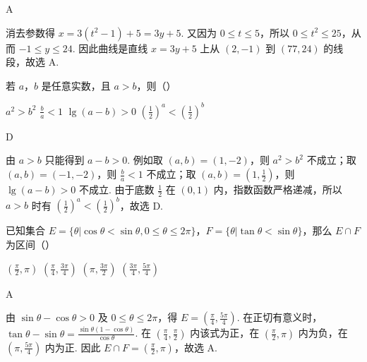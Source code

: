 \begin{answer}
A
\end{answer}

\begin{solution}
消去参数得 \(x=3(t^2-1)+5=3y+5\). 又因为
\(0\leqslant t\leqslant5\)，所以 \(0\leqslant t^2\leqslant25\)，从而
\(-1\leqslant y\leqslant24\). 因此曲线是直线
\(x=3y+5\) 上从 \((2,-1)\) 到 \((77,24)\) 的线段，故选 A.
\end{solution}

\begin{problem}
若 \(a\)，\(b\) 是任意实数，且 \(a > b\)，则（\quad）

\choices
    {\(a^2 > b^2\)}
    {\(\frac{b}{a} < 1\)}
    {\(\lg (a - b) > 0\)}
    {\(\left(\frac{1}{2}\right)^a < \left(\frac{1}{2}\right)^b\)}
\end{problem}

\begin{answer}
D
\end{answer}

\begin{solution}
由 \(a>b\) 只能得到 \(a-b>0\). 例如取 \((a,b)=(1,-2)\)，则
\(a^2>b^2\) 不成立；取 \((a,b)=(-1,-2)\)，则
\(\frac{b}{a}<1\) 不成立；取 \((a,b)=(1,\frac{1}{2})\)，则
\(\lg(a-b)>0\) 不成立. 由于底数
\(\frac{1}{2}\) 在 \((0,1)\) 内，指数函数严格递减，所以
\(a>b\) 时有
\(\left(\frac{1}{2}\right)^a<\left(\frac{1}{2}\right)^b\)，故选 D.
\end{solution}

\begin{problem}
已知集合 \(E = \{\theta | \cos \theta < \sin \theta, 0 \leqslant \theta \leqslant 2\pi\}\)，\(F = \{\theta | \tan \theta < \sin \theta\}\)，那么 \(E \cap F\) 为区间（\quad）

\choices
    {\(\left(\frac{\pi}{2},\pi\right)\)}
    {\(\left(\frac{\pi}{4},\frac{3\pi}{4}\right)\)}
    {\(\left(\pi,\frac{3\pi}{2}\right)\)}
    {\(\left(\frac{3\pi}{4},\frac{5\pi}{4}\right)\)}
\end{problem}

\begin{answer}
A
\end{answer}

\begin{solution}
由 \(\sin\theta-\cos\theta>0\) 及 \(0\leqslant\theta\leqslant2\pi\)，得
\(E=\left(\frac{\pi}{4},\frac{5\pi}{4}\right)\). 在正切有意义时，
\(\tan\theta-\sin\theta=\frac{\sin\theta(1-\cos\theta)}{\cos\theta}\).
在 \(\left(\frac{\pi}{4},\frac{\pi}{2}\right)\) 内该式为正，在
\(\left(\frac{\pi}{2},\pi\right)\) 内为负，在
\(\left(\pi,\frac{5\pi}{4}\right)\) 内为正. 因此
\(E\cap F=\left(\frac{\pi}{2},\pi\right)\)，故选 A.
\end{solution}

